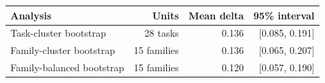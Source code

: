 \begin{tabular}{lrrr}
\toprule
Analysis & Units & Mean delta & 95\% interval \\
\midrule
Task-cluster bootstrap & 28 tasks & 0.136 & [0.085, 0.191] \\
Family-cluster bootstrap & 15 families & 0.136 & [0.065, 0.207] \\
Family-balanced bootstrap & 15 families & 0.120 & [0.057, 0.190] \\
\bottomrule
\end{tabular}
